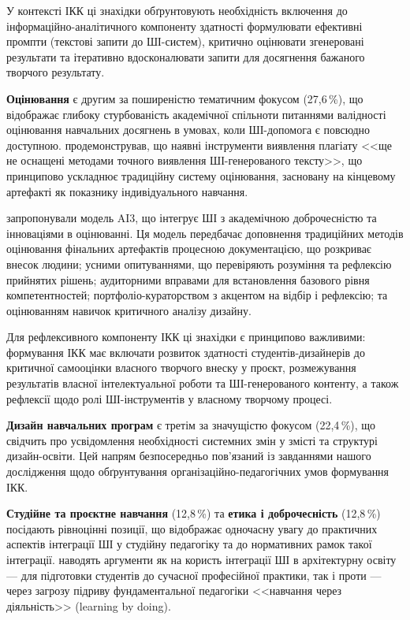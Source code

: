 У контексті ІКК ці знахідки обґрунтовують необхідність включення до інформаційно-аналітичного компоненту здатності формулювати ефективні промпти (текстові запити до ШІ-систем), критично оцінювати згенеровані результати та ітеративно вдосконалювати запити для досягнення бажаного творчого результату.

\textbf{Оцінювання} є другим за поширеністю тематичним фокусом (27,6\,\%), що відображає глибоку стурбованість академічної спільноти питаннями валідності оцінювання навчальних досягнень в умовах, коли ШІ-допомога є повсюдно доступною. \citet{Perkins2023} продемонстрував, що наявні інструменти виявлення плагіату <<ще не оснащені методами точного виявлення ШІ-генерованого тексту>>, що принципово ускладнює традиційну систему оцінювання, засновану на кінцевому артефакті як показнику індивідуального навчання.

\citet{Deluca2025} запропонували модель AI3, що інтегрує ШІ з академічною доброчесністю та інноваціями в оцінюванні. Ця модель передбачає доповнення традиційних методів оцінювання фінальних артефактів процесною документацією, що розкриває внесок людини; усними опитуваннями, що перевіряють розуміння та рефлексію прийнятих рішень; аудиторними вправами для встановлення базового рівня компетентностей; портфоліо-кураторством з акцентом на відбір і рефлексію; та оцінюванням навичок критичного аналізу дизайну.

Для рефлексивного компоненту ІКК ці знахідки є принципово важливими: формування ІКК має включати розвиток здатності студентів-дизайнерів до критичної самооцінки власного творчого внеску у проєкт, розмежування результатів власної інтелектуальної роботи та ШІ-генерованого контенту, а також рефлексії щодо ролі ШІ-інструментів у власному творчому процесі.

\textbf{Дизайн навчальних програм} є третім за значущістю фокусом (22,4\,\%), що свідчить про усвідомлення необхідності системних змін у змісті та структурі дизайн-освіти. Цей напрям безпосередньо пов'язаний із завданнями нашого дослідження щодо обґрунтування організаційно-педагогічних умов формування ІКК.

\textbf{Студійне та проєктне навчання} (12,8\,\%) та \textbf{етика і доброчесність} (12,8\,\%) посідають рівноцінні позиції, що відображає одночасну увагу до практичних аспектів інтеграції ШІ у студійну педагогіку та до нормативних рамок такої інтеграції. \citet{Iranmanesh2024} наводять аргументи як на користь інтеграції ШІ в архітектурну освіту --- для підготовки студентів до сучасної професійної практики, так і проти --- через загрозу підриву фундаментальної педагогіки <<навчання через діяльність>> (learning by doing).

